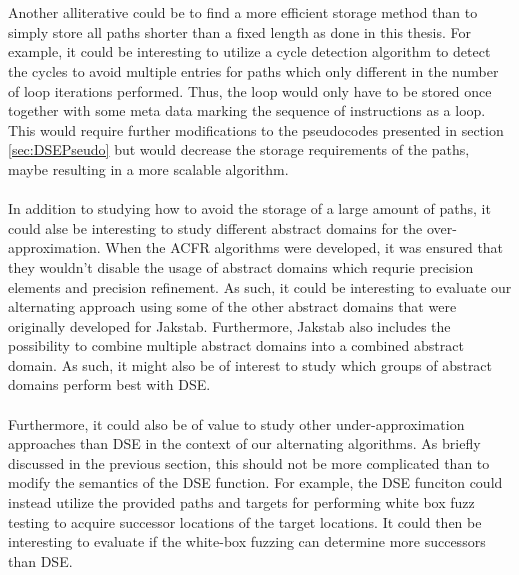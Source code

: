 \documentclass{kththesis}
\begin{document}
\\ \\
Another alliterative could be to find a more efficient storage method than to simply store all paths shorter than a fixed length as done in this thesis. For example, it could be interesting to utilize a cycle detection algorithm to detect the cycles to avoid multiple entries for paths which only different in the number of loop iterations performed. Thus, the loop would only have to be stored once together with some meta data marking the sequence of instructions as a loop. This would require further modifications to the pseudocodes presented in section \ref{sec:DSEPseudo} but would decrease the storage requirements of the paths, maybe resulting in a more scalable algorithm.
\\ \\
In addition to studying how to avoid the storage of a large amount of paths, it could alse be interesting to study different abstract domains for the over-approximation. When the ACFR algorithms were developed, it was ensured that they wouldn't disable the usage of abstract domains which requrie precision elements and precision refinement. As such, it could be interesting to evaluate our alternating approach using some of the other abstract domains that were originally developed for Jakstab. Furthermore, Jakstab also includes the possibility to combine multiple abstract domains into a combined abstract domain. As such, it might also be of interest to study which groups of abstract domains perform best  with DSE.
\\ \\
Furthermore, it could also be of value to study other under-approximation approaches than DSE in the context of our alternating algorithms. As briefly discussed in the previous section, this should not be more complicated than to modify the semantics of the DSE function. For example, the DSE funciton could instead utilize the provided paths and targets for performing white box fuzz testing\cite{automatedFuzzing} to acquire successor locations of the target locations. It could then be interesting to evaluate if the white-box fuzzing can determine more successors than DSE.

\begin{otherlanguage}{australian}%
\printbibliography[heading=bibintoc]
\end{otherlanguage}
\end{document}
